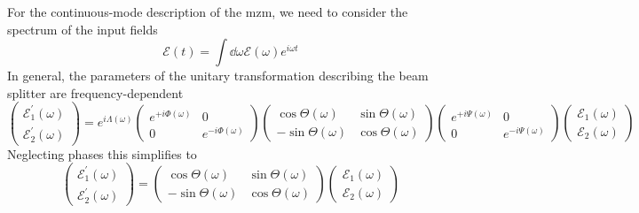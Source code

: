 For the continuous-mode description of the \gls{mzm}, we need to consider the spectrum of the input fields
\begin{equation}
    \mathcal{E}(t)
    =
    \int\dd{\omega}\mathcal{E}(\omega)e^{i\omega t}
\end{equation}
In general, the parameters of the unitary transformation describing the beam splitter are frequency-dependent
\begin{equation}
    \begin{pmatrix}
        \mathcal{E}_1^\prime(\omega)
        \\
        \mathcal{E}_2^\prime(\omega)
    \end{pmatrix}
    =
    e^{i\Lambda(\omega)}
    \begin{pmatrix}
        e^{+i\Phi(\omega)} & 0
        \\
        0 & e^{-i\Phi(\omega)}
    \end{pmatrix}
    \begin{pmatrix}
        \cos\Theta(\omega) & \sin\Theta(\omega)
        \\
        -\sin\Theta(\omega) & \cos\Theta(\omega)
    \end{pmatrix}
    \begin{pmatrix}
        e^{+i\Psi(\omega)} & 0
        \\
        0 & e^{-i\Psi(\omega)}
    \end{pmatrix}
    \begin{pmatrix}
        \mathcal{E}_1(\omega)
        \\
        \mathcal{E}_2(\omega)
    \end{pmatrix}
\end{equation}
Neglecting phases this simplifies to
\begin{equation}
    \begin{pmatrix}
        \mathcal{E}_1^\prime(\omega)
        \\
        \mathcal{E}_2^\prime(\omega)
    \end{pmatrix}
    =
    \begin{pmatrix}
        \cos\Theta(\omega) & \sin\Theta(\omega)
        \\
        -\sin\Theta(\omega) & \cos\Theta(\omega)
    \end{pmatrix}
    \begin{pmatrix}
        \mathcal{E}_1(\omega)
        \\
        \mathcal{E}_2(\omega)
    \end{pmatrix}
\end{equation}
